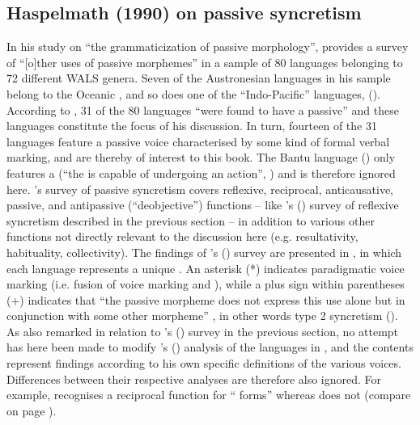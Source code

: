 \subsection{Haspelmath (1990) on passive syncretism} \label{haspelmath-syncretism}
In his study on “the grammaticization of passive morphology”, \citet[36]{haspelmath:1990} provides a survey of “[o]ther uses of passive morphemes” in a sample of 80 languages belonging to 72 different WALS genera. Seven of the Austronesian languages in his sample belong to the Oceanic , and so does one of the “Indo-Pacific” languages,  (). According to \citet[28]{haspelmath:1990}, 31 of the 80 languages “were found to have a passive” and these languages constitute the focus of his discussion. In turn, fourteen of the 31 languages feature a passive voice characterised by some kind of formal verbal marking, and are thereby of interest to this book. The Bantu language  () only features a  (“the  is capable of undergoing an action”, \citealt[33]{haspelmath:1990}) and is therefore ignored here. \citeauthor{haspelmath:1990}’s survey of passive syncretism covers reflexive, reciprocal, anticausative, passive, and antipassive (“deobjective”) functions -- like \citeauthor{geniusiene:1987}’s (\citeyear{geniusiene:1987}) survey of reflexive syncretism described in the previous section -- in addition to various other functions not directly relevant to the discussion here (e.g. resultativity, habituality, collectivity). The findings of \citeauthor{haspelmath:1990}’s (\citeyear{haspelmath:1990}) survey are presented in , in which each language represents a unique . An asterisk (*) indicates paradigmatic voice marking (i.e. fusion of voice marking and ), while a plus sign within parentheses (+) indicates that “the passive morpheme does not express this use alone but in conjunction with some other morpheme” \citep[36]{haspelmath:1990}, in other words type 2 syncretism (). As also remarked in relation to \citeauthor{geniusiene:1987}’s (\citeyear{geniusiene:1987}) survey in the previous section, no attempt has here been made to modify \citeauthor{haspelmath:1990}’s (\citeyear{haspelmath:1990}) analysis of the languages in , and the contents represent findings according to his own specific definitions of the various voices. Differences between their respective analyses are therefore also ignored. For example, \citeauthor{geniusiene:1987} recognises a reciprocal function for  “ forms” whereas \citeauthor{haspelmath:1990} does not (compare  on page \pageref{tab:ch3:geniusiene}). 

